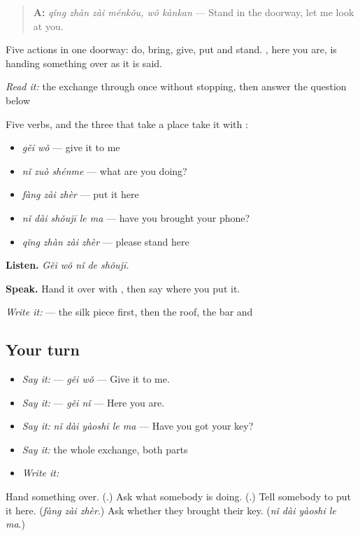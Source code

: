 \begin{quote}
\textbf{A:} \emph{qǐng zhàn zài ménkǒu, wǒ kànkan} — Stand in the doorway, let me look at you.
\end{quote}

Five actions in one doorway: do, bring, give, put and stand. , here you are, is  handing something over as it is said.

\begin{tcolorbox}[breakable,skin=enhanced,colback=orange!6,colframe=orange!45!black,boxrule=0.5pt,arc=1mm,left=6pt,right=6pt,top=4pt,bottom=4pt,fonttitle=\bfseries,title={Read this}]
\emph{Read it:} the exchange through once without stopping, then answer the question below
\end{tcolorbox}

\begin{grammarlens}[title={What you've built — five actions}]
Five verbs, and the three that take a place take it with :

\begin{itemize}
\raggedright
  \item \textbf{} \emph{gěi wǒ} — give it to me
  \item \textbf{} \emph{nǐ zuò shénme} — what are you doing?
  \item \emph{fàng zài zhèr} — put it here
  \item \emph{nǐ dài shǒujī le ma} — have you brought your phone?
  \item \emph{qǐng zhàn zài zhèr} — please stand here
\end{itemize}

\textbf{Listen.} \emph{Gěi wǒ nǐ de shǒujī.}

\textbf{Speak.} Hand it over with , then say where you put it.

\emph{Write it:}  — the silk piece first, then the roof, the bar and 
\end{grammarlens}

\subsection*{Your turn}
\begin{itemize}
\raggedright
  \item \emph{Say it:}  — \emph{gěi wǒ} — Give it to me.
  \item \emph{Say it:}  — \emph{gěi nǐ} — Here you are.
  \item \emph{Say it:} \emph{nǐ dài yàoshi le ma} — Have you got your key?
  \item \emph{Say it:} the whole exchange, both parts
  \item \emph{Write it:} 
\end{itemize}

\begin{tcolorbox}[breakable,colback=teal!4,colframe=teal!35!black,title={Before you move on}]
Hand something over. (\textbf{}.) Ask what somebody is doing. (\textbf{}.) Tell somebody to put it here. (\emph{fàng zài zhèr}.) Ask whether they brought their key. (\emph{nǐ dài yàoshi le ma}.)
\end{tcolorbox}
